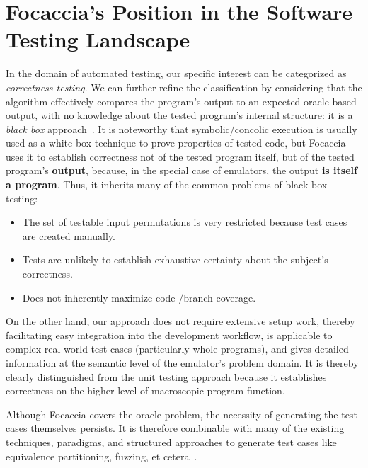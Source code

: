 \section{Focaccia's Position in the Software Testing Landscape}\label{sec:testing}

In the domain of automated testing, our specific interest can be categorized as \textit{correctness testing}. We can
further refine the classification by considering that the algorithm effectively compares the program's output to an
expected oracle-based output, with no knowledge about the tested program's internal structure: it is a \textit{black
box} approach~\cite{sawant2012software}. It is noteworthy that symbolic/concolic execution is usually used as a
white-box technique to prove properties of tested code, but Focaccia uses it to establish correctness not of the tested
program itself, but of the tested program's \textbf{output}, because, in the special case of emulators, the output
\textbf{is itself a program}. Thus, it inherits many of the common problems of black box testing:

\begin{itemize}
    \item The set of testable input permutations is very restricted because test cases are created manually.
    \item Tests are unlikely to establish exhaustive certainty about the subject's correctness.
    \item Does not inherently maximize code-/branch coverage.
\end{itemize}

On the other hand, our approach does not require extensive setup work, thereby facilitating easy integration into the
development workflow, is applicable to complex real-world test cases (particularly whole programs), and gives detailed
information at the semantic level of the emulator's problem domain. It is thereby clearly distinguished from the unit
testing approach because it establishes correctness on the higher level of macroscopic program function.

Although Focaccia covers the oracle problem, the necessity of generating the test cases themselves persists. It is
therefore combinable with many of the existing techniques, paradigms, and structured approaches to generate test
cases like equivalence partitioning, fuzzing, et cetera~\cite{jan2016innovative, yu2011robust_planning}.

